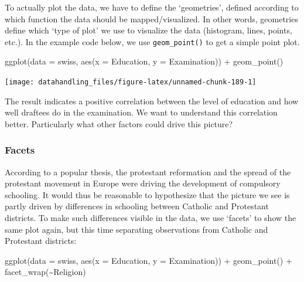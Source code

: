 \documentclass[
  12pt,
]{style/krantz}
\newenvironment{Shaded}{\begin{snugshade}}{\end{snugshade}}
\newcommand{\AttributeTok}[1]{\textcolor[rgb]{0.77,0.63,0.00}{#1}}
\newcommand{\FunctionTok}[1]{\textcolor[rgb]{0.00,0.00,0.00}{#1}}
\newcommand{\NormalTok}[1]{#1}
\newcommand{\SpecialCharTok}[1]{\textcolor[rgb]{0.00,0.00,0.00}{#1}}
\begin{document}
To actually plot the data, we have to define the `geometries', defined according to which function the data should be mapped/visualized. In other words, geometries define which `type of plot' we use to visualize the data (histogram, lines, points, etc.). In the example code below, we use \texttt{geom\_point()} to get a simple point plot.

\begin{Shaded}
\begin{Highlighting}[]
\FunctionTok{ggplot}\NormalTok{(}\AttributeTok{data =}\NormalTok{ swiss, }\FunctionTok{aes}\NormalTok{(}\AttributeTok{x =}\NormalTok{ Education, }\AttributeTok{y =}\NormalTok{ Examination)) }\SpecialCharTok{+}
     \FunctionTok{geom\_point}\NormalTok{()}
\end{Highlighting}
\end{Shaded}

\texttt{[image: datahandling\_files/figure-latex/unnamed-chunk-189-1]}

The result indicates a positive correlation between the level of education and how well draftees do in the examination. We want to understand this correlation better. Particularly what other factors could drive this picture?

\hypertarget{facets}{%
\subsubsection{Facets}\label{facets}}

According to a popular thesis, the protestant reformation and the spread of the protestant movement in Europe were driving the development of compulsory schooling. It would thus be reasonable to hypothesize that the picture we see is partly driven by differences in schooling between Catholic and Protestant districts. To make such differences visible in the data, we use `facets' to show the same plot again, but this time separating observations from Catholic and Protestant districts:

\begin{Shaded}
\begin{Highlighting}[]
\FunctionTok{ggplot}\NormalTok{(}\AttributeTok{data =}\NormalTok{ swiss, }\FunctionTok{aes}\NormalTok{(}\AttributeTok{x =}\NormalTok{ Education, }\AttributeTok{y =}\NormalTok{ Examination)) }\SpecialCharTok{+}
     \FunctionTok{geom\_point}\NormalTok{() }\SpecialCharTok{+}
     \FunctionTok{facet\_wrap}\NormalTok{(}\SpecialCharTok{\textasciitilde{}}\NormalTok{Religion)}
\end{Highlighting}
\end{Shaded}
\end{document}
